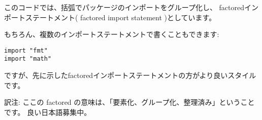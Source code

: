 このコードでは、括弧でパッケージのインポートをグループ化し、
factoredインポートステートメント( factored import statement )としています。

もちろん、複数のインポートステートメントで書くこともできます:

\begin{lstlisting}[numbers=none]
import "fmt"
import "math"
\end{lstlisting}

ですが、先に示したfactoredインポートステートメントの方がより良いスタイルです。

訳注: ここの factored の意味は、「要素化、グループ化、整理済み」ということです。
良い日本語募集中。
